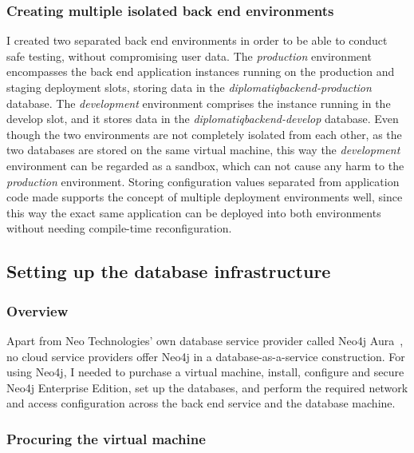 \subsubsection{Creating multiple isolated back end environments}

I created two separated back end environments in order to be able to conduct safe testing, without compromising user data. The \emph{production} environment encompasses the back end application instances running on the production and staging deployment slots, storing data in the \emph{diplomatiqbackend-production} database. The \emph{development} environment comprises the instance running in the develop slot, and it stores data in the \emph{diplomatiqbackend-develop} database. Even though the two environments are not completely isolated from each other, as the two databases are stored on the same virtual machine, this way the \emph{development} environment can be regarded as a sandbox, which can not cause any harm to the \emph{production} environment. Storing configuration values separated from application code made supports the concept of multiple deployment environments well, since this way the exact same application can be deployed into both environments without needing compile-time reconfiguration.

\subsection{Setting up the database infrastructure}
\label{section:database}

\subsubsection{Overview}

Apart from Neo Technologies' own database service provider called Neo4j Aura~\cite{neo4j-aura}, no cloud service providers offer Neo4j in a database-as-a-service construction. For using Neo4j, I needed to purchase a virtual machine, install, configure and secure Neo4j Enterprise Edition, set up the databases, and perform the required network and access configuration across the back end service and the database machine.

\subsubsection{Procuring the virtual machine}


